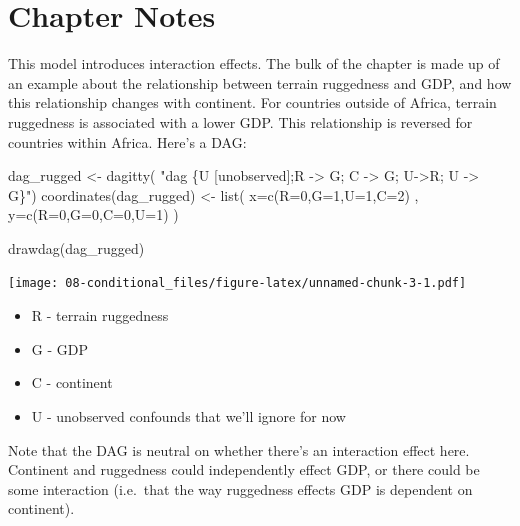 \documentclass[
]{book}
\newenvironment{Shaded}{\begin{snugshade}}{\end{snugshade}}
\newcommand{\AttributeTok}[1]{\textcolor[rgb]{0.77,0.63,0.00}{#1}}
\newcommand{\DecValTok}[1]{\textcolor[rgb]{0.00,0.00,0.81}{#1}}
\newcommand{\FunctionTok}[1]{\textcolor[rgb]{0.00,0.00,0.00}{#1}}
\newcommand{\NormalTok}[1]{#1}
\newcommand{\OtherTok}[1]{\textcolor[rgb]{0.56,0.35,0.01}{#1}}
\newcommand{\StringTok}[1]{\textcolor[rgb]{0.31,0.60,0.02}{#1}}
\providecommand{\tightlist}{%
  \setlength{\itemsep}{0pt}\setlength{\parskip}{0pt}}
\begin{document}
\hypertarget{chapter-notes-7}{%
\section{Chapter Notes}\label{chapter-notes-7}}

This model introduces interaction effects. The bulk of the chapter is made up of an example about the relationship between terrain ruggedness and GDP, and how this relationship changes with continent. For countries outside of Africa, terrain ruggedness is associated with a lower GDP. This relationship is reversed for countries within Africa. Here's a DAG:

\begin{Shaded}
\begin{Highlighting}[]
\NormalTok{dag\_rugged }\OtherTok{\textless{}{-}} \FunctionTok{dagitty}\NormalTok{( }\StringTok{"dag \{U [unobserved];R {-}\textgreater{} G; C {-}\textgreater{} G; U{-}\textgreater{}R; U {-}\textgreater{} G\}"}\NormalTok{)}
\FunctionTok{coordinates}\NormalTok{(dag\_rugged) }\OtherTok{\textless{}{-}} \FunctionTok{list}\NormalTok{( }\AttributeTok{x=}\FunctionTok{c}\NormalTok{(}\AttributeTok{R=}\DecValTok{0}\NormalTok{,}\AttributeTok{G=}\DecValTok{1}\NormalTok{,}\AttributeTok{U=}\DecValTok{1}\NormalTok{,}\AttributeTok{C=}\DecValTok{2}\NormalTok{) , }\AttributeTok{y=}\FunctionTok{c}\NormalTok{(}\AttributeTok{R=}\DecValTok{0}\NormalTok{,}\AttributeTok{G=}\DecValTok{0}\NormalTok{,}\AttributeTok{C=}\DecValTok{0}\NormalTok{,}\AttributeTok{U=}\DecValTok{1}\NormalTok{) )}

\FunctionTok{drawdag}\NormalTok{(dag\_rugged)}
\end{Highlighting}
\end{Shaded}

\texttt{[image: 08-conditional\_files/figure-latex/unnamed-chunk-3-1.pdf]}

\begin{itemize}
\tightlist
\item
  R - terrain ruggedness
\item
  G - GDP
\item
  C - continent
\item
  U - unobserved confounds that we'll ignore for now
\end{itemize}

Note that the DAG is neutral on whether there's an interaction effect here. Continent and ruggedness could independently effect GDP, or there could be some interaction (i.e.~that the way ruggedness effects GDP is dependent on continent).
\end{document}
